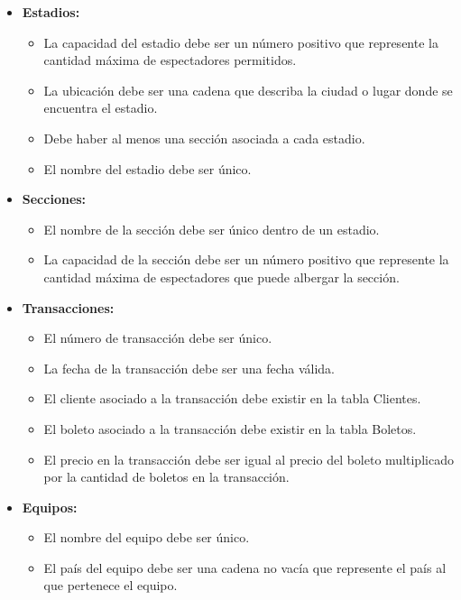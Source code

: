 \begin{itemize}
    \item \textbf{Estadios:}
        \begin{itemize}
            \item La capacidad del estadio debe ser un número positivo que represente la cantidad máxima de espectadores permitidos.
            \item La ubicación debe ser una cadena que describa la ciudad o lugar donde se encuentra el estadio.
            \item Debe haber al menos una sección asociada a cada estadio.
            \item El nombre del estadio debe ser único.
        \end{itemize}
    \item \textbf{Secciones:}
        \begin{itemize}
            \item El nombre de la sección debe ser único dentro de un estadio.
            \item La capacidad de la sección debe ser un número positivo que represente la cantidad máxima de espectadores que puede albergar la sección.
        \end{itemize}    

    \item \textbf{Transacciones:} 
        \begin{itemize}
            \item El número de transacción debe ser único.
            \item La fecha de la transacción debe ser una fecha válida.
            \item El cliente asociado a la transacción debe existir en la tabla Clientes.
            \item El boleto asociado a la transacción debe existir en la tabla Boletos.
            \item El precio en la transacción debe ser igual al precio del boleto multiplicado por la cantidad de boletos en la transacción.
        \end{itemize}

    \item \textbf{Equipos:} 
        \begin{itemize}
            \item El nombre del equipo debe ser único.
            \item El país del equipo debe ser una cadena no vacía que represente el país al que pertenece el equipo.            
        \end{itemize}    
    

\end{itemize}

